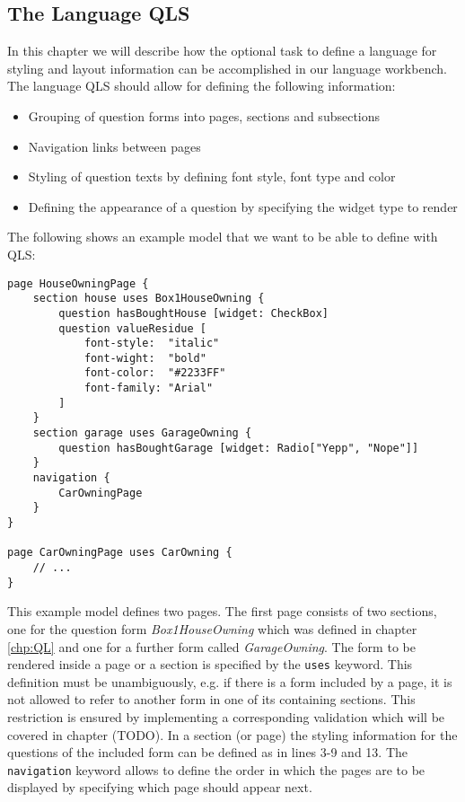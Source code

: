 \subsection{The Language QLS}

In this chapter we will describe how the optional task to define a language 
for styling and layout information can be accomplished in our language workbench.
The language QLS should allow for defining the following information:
\begin{itemize}
  \item Grouping of question forms into pages, sections and subsections
  \item Navigation links between pages
  \item Styling of question texts by defining font style, font type and color
  \item Defining the appearance of a question by specifying the widget type to render
\end{itemize}

The following shows an example model that we want to be able to define with QLS:

\begin{lstlisting}[language=QLS]
page HouseOwningPage {
	section house uses Box1HouseOwning {
		question hasBoughtHouse [widget: CheckBox]
		question valueResidue [
			font-style:  "italic"
			font-wight:  "bold" 
			font-color:  "#2233FF"
			font-family: "Arial"
		]
	}
	section garage uses GarageOwning {
		question hasBoughtGarage [widget: Radio["Yepp", "Nope"]]		
	}
	navigation {
		CarOwningPage
	}
}

page CarOwningPage uses CarOwning {
	// ...
}
\end{lstlisting}

This example model defines two pages. The first page consists of two sections,
one for the question form \emph{Box1HouseOwning} which was defined in chapter 
\ref{chp:QL} and one for a further form called \emph{GarageOwning}. The form to
be rendered inside a page or a section is specified by the \texttt{uses} keyword.
This definition must be unambiguously, e.g. if there is a form included by a page,
it is not allowed to refer to another form in one of its containing sections.
This restriction is ensured by implementing a corresponding validation which will be covered
in chapter (TODO). In a section (or page) the styling information for the questions of the included
form can be defined as in lines 3-9 and 13. The \texttt{navigation} keyword allows to define the order in which the pages are to
be displayed by specifying which page should appear next.

